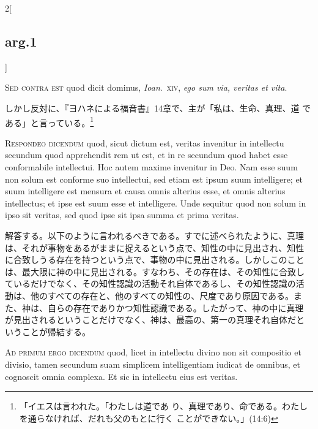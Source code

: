 \documentclass[paper=a4paper,fontsize=10pt,jafontsize=9pt,titlepage]{jlreq}
\begin{document}
\begin{paracol}{2}[\subsection{arg.1}]
\switchcolumn*[\subsection{s.c.}]


{\scshape Sed contra est} quod dicit dominus, {\itshape
Ioan}.~{\scshape xiv}, {\itshape ego sum via, veritas et vita}.

\switchcolumn

しかし反対に、『ヨハネによる福音書』14章で、主が「私は、生命、真理、道
 である」と言っている。\footnote{「イエスは言われた。「わたしは道であ
 り、真理であり、命である。わたしを通らなければ、だれも父のもとに行く
 ことができない。」(14:6)}



{\scshape Respondeo dicendum} quod, sicut dictum est, veritas
 invenitur in intellectu secundum quod apprehendit rem ut est, et in
 re secundum quod habet esse conformabile intellectui. Hoc autem
 maxime invenitur in Deo. Nam esse suum non solum est conforme suo
 intellectui, sed etiam est ipsum suum intelligere; et suum
 intelligere est mensura et causa omnis alterius esse, et omnis
 alterius intellectus; et ipse est suum esse et intelligere. Unde
 sequitur quod non solum in ipso sit veritas, sed quod ipse sit ipsa
 summa et prima veritas.

\switchcolumn

解答する。以下のように言われるべきである。すでに述べられたように、真理
は、それが事物をあるがままに捉えるという点で、知性の中に見出され、知性
に合致しうる存在を持つという点で、事物の中に見出される。しかしこのこと
は、最大限に神の中に見出される。すなわち、その存在は、その知性に合致し
ているだけでなく、その知性認識の活動それ自体であるし、その知性認識の活
動は、他のすべての存在と、他のすべての知性の、尺度であり原因である。ま
た、神は、自らの存在でありかつ知性認識である。したがって、神の中に真理
が見出されるということだけでなく、神は、最高の、第一の真理それ自体だと
いうことが帰結する。

\switchcolumn*[\subsection{ad.1}]


{\scshape Ad primum ergo dicendum} quod, licet in intellectu divino
 non sit compositio et divisio, tamen secundum suam simplicem
 intelligentiam iudicat de omnibus, et cognoscit omnia complexa. Et
 sic in intellectu eius est veritas.


\end{paracol}
\end{document}
